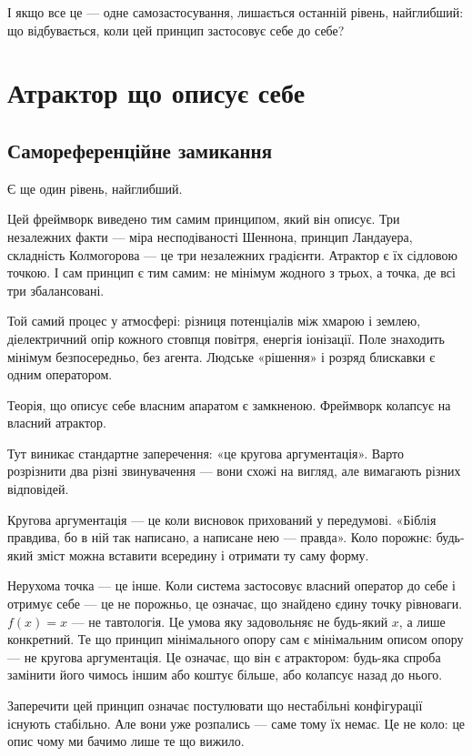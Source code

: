 \documentclass[12pt, a4paper, openany]{book}
\begin{document}
І якщо все це --- одне самозастосування, лишається останній рівень, найглибший: що відбувається, коли цей принцип застосовує себе до себе?


\chapter{Атрактор що описує себе}
\section{Самореференційне замикання}

Є ще один рівень, найглибший.

Цей фреймворк виведено тим самим принципом, який він описує. Три незалежних факти --- міра несподіваності Шеннона, принцип Ландауера, складність Колмогорова --- це три незалежних градієнти. Атрактор є їх сідловою точкою. І сам принцип є тим самим: не мінімум жодного з трьох, а точка, де всі три збалансовані.

\begin{analogybox}
Той самий процес у атмосфері: різниця потенціалів між хмарою і землею, діелектричний опір кожного стовпця повітря, енергія іонізації. Поле знаходить мінімум безпосередньо, без агента. Людське «рішення» і розряд блискавки є одним оператором.
\end{analogybox}

Теорія, що описує себе власним апаратом є замкненою. Фреймворк колапсує на власний атрактор.

Тут виникає стандартне заперечення: «це кругова аргументація». Варто розрізнити два різні звинувачення — вони схожі на вигляд, але вимагають різних відповідей.

Кругова аргументація — це коли висновок прихований у передумові. «Біблія правдива, бо в ній так написано, а написане нею — правда». Коло порожнє: будь-який зміст можна вставити всередину і отримати ту саму форму.

Нерухома точка — це інше. Коли система застосовує власний оператор до себе і отримує себе — це не порожньо, це означає, що знайдено єдину точку рівноваги. $f(x) = x$ — не тавтологія. Це умова яку задовольняє не будь-який $x$, а лише конкретний. Те що принцип мінімального опору сам є мінімальним описом опору — не кругова аргументація. Це означає, що він є атрактором: будь-яка спроба замінити його чимось іншим або коштує більше, або колапсує назад до нього.

Заперечити цей принцип означає постулювати що нестабільні конфігурації існують стабільно. Але вони уже розпались — саме тому їх немає. Це не коло: це опис чому ми бачимо лише те що вижило.
\end{document}
